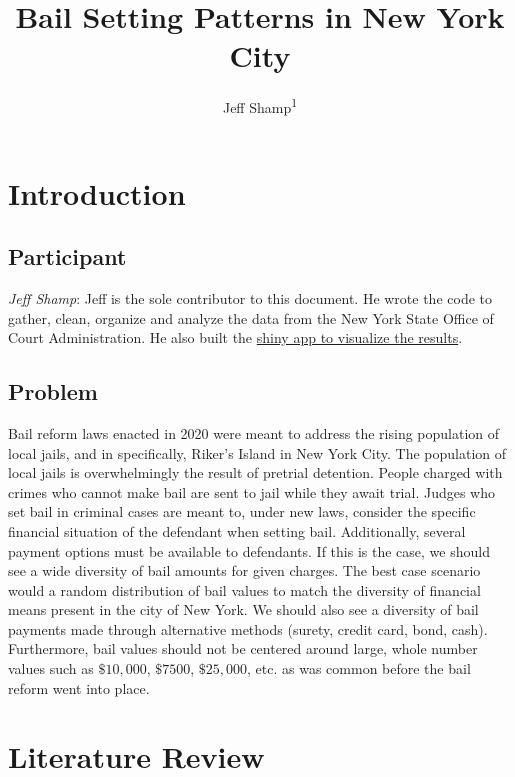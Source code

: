 \documentclass[
  english,
  man]{apa6}
\title{Bail Setting Patterns in New York City}
\author{Jeff Shamp\textsuperscript{1}}
\date{}
\affiliation{\vspace{0.5cm}\textsuperscript{1} CUNY SPS - MSDS}
\begin{document}
\maketitle

\hypertarget{introduction}{%
\section{Introduction}\label{introduction}}

\hypertarget{participant}{%
\subsection{Participant}\label{participant}}

\emph{Jeff Shamp}: Jeff is the sole contributor to this document. He wrote the code to gather, clean, organize and analyze the data from the New York State Office of Court Administration. He also built the \href{https://shamp-jeff.shinyapps.io/Bail_Setting_Patterns_in_New_York_City/}{shiny app to visualize the results}.

\hypertarget{problem}{%
\subsection{Problem}\label{problem}}

Bail reform laws enacted in 2020 were meant to address the rising population of local jails, and in specifically, Riker's Island in New York City. The population of local jails is overwhelmingly the result of pretrial detention. People charged with crimes who cannot make bail are sent to jail while they await trial. Judges who set bail in criminal cases are meant to, under new laws, consider the specific financial situation of the defendant when setting bail. Additionally, several payment options must be available to defendants. If this is the case, we should see a wide diversity of bail amounts for given charges. The best case scenario would a random distribution of bail values to match the diversity of financial means present in the city of New York. We should also see a diversity of bail payments made through alternative methods (surety, credit card, bond, cash). Furthermore, bail values should not be centered around large, whole number values such as \(\$10,000\), \(\$7500\), \(\$25,000\), etc. as was common before the bail reform went into place.

\hypertarget{literature-review}{%
\section{Literature Review}\label{literature-review}}
\end{document}
